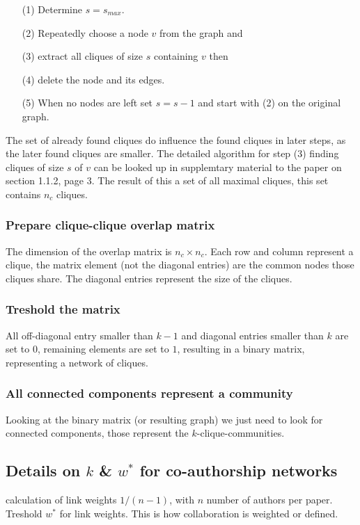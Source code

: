\documentclass[runningheads,a4paper]{llncs}
\begin{document}
\begin{enumerate}
\item[(1)] Determine $s=s_{max}$.
\item[(2)] Repeatedly choose a node $v$ from the graph and
\item[(3)] extract all cliques of size $s$ containing $v$ then
\item[(4)] delete the node and its edges.
\item[(5)] When no nodes are left set $s=s-1$ and start with (2) on the original graph.
\end{enumerate}

The set of already found cliques do influence the found cliques in later steps, as the later found cliques are smaller. The detailed algorithm for step (3) finding cliques of size $s$ of $v$ can be looked up in supplemtary material to the paper on section 1.1.2, page 3. The result of this a set of all maximal cliques, this set contains $n_c$ cliques.

\subsubsection{Prepare clique-clique overlap matrix}
The dimension of the overlap matrix is $n_c \times n_c$. Each row and column represent a clique, the matrix element (not the diagonal entries) are the common nodes those cliques share. The diagonal entries represent the size of the cliques.

\subsubsection{Treshold the matrix}
All off-diagonal entry smaller than $k-1$ and diagonal entries smaller than $k$ are set to $0$, remaining elements are set to $1$, resulting in a binary matrix, representing a network of cliques.
 
\subsubsection{All connected components represent a community}
Looking at the binary matrix (or resulting graph) we just need to look for connected components, those represent the $k$-clique-communities.


\subsection{Details on $k$ \& $w^*$ for co-authorship networks}
calculation of link weights $1/(n-1)$, with $n$ number of authors per paper. Treshold $w^*$ for link weights. This is how collaboration is weighted or defined.
\end{document}
